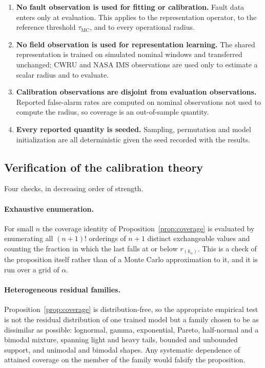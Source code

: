 \documentclass[a4paper]{cas-sc}
\newcommand{\residual}{\ensuremath{r}}
\newcommand{\taumc}{\ensuremath{\tau_{\mathrm{MC}}}}
\begin{document}
\begin{enumerate}[leftmargin=1.8em]
\item \textbf{No fault observation is used for fitting or calibration.} Fault
      data enters only at evaluation. This applies to the representation
      operator, to the reference threshold \(\taumc\), and to every
      operational radius.
\item \textbf{No field observation is used for representation learning.} The
      shared representation is trained on simulated nominal windows and
      transferred unchanged; CWRU and NASA IMS observations are used only to
      estimate a scalar radius and to evaluate.
\item \textbf{Calibration observations are disjoint from evaluation
      observations.} Reported false-alarm rates are computed on nominal
      observations not used to compute the radius, so coverage is an
      out-of-sample quantity.
\item \textbf{Every reported quantity is seeded.} Sampling, permutation and
      model initialization are all deterministic given the seed recorded with
      the results.
\end{enumerate}

\subsection{Verification of the calibration theory}
\label{subsec:design_verification}

Four checks, in decreasing order of strength.

\paragraph{Exhaustive enumeration.}
For small \(n\) the coverage identity of Proposition~\ref{prop:coverage} is
evaluated by enumerating all \((n+1)!\) orderings of \(n+1\) distinct
exchangeable values and counting the fraction in which the last falls at or
below \(\residual_{(k_\alpha)}\). This is a check of the proposition itself
rather than of a Monte Carlo approximation to it, and it is run over a grid of
\(\alpha\).

\paragraph{Heterogeneous residual families.}
Proposition~\ref{prop:coverage} is distribution-free, so the appropriate
empirical test is not the residual distribution of one trained model but a
family chosen to be as dissimilar as possible: lognormal, gamma, exponential,
Pareto, half-normal and a bimodal mixture, spanning light and heavy tails,
bounded and unbounded support, and unimodal and bimodal shapes. Any systematic
dependence of attained coverage on the member of the family would falsify the
proposition.
\end{document}
